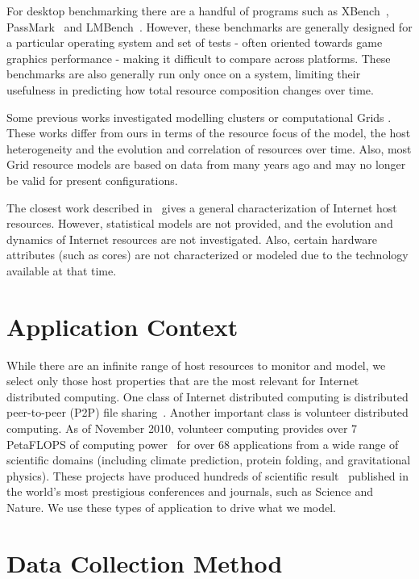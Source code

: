 \documentclass[conference]{IEEEtran}
\begin{document}
For desktop benchmarking there are a handful of programs such as XBench~\cite{xbench},
PassMark~\cite{passmark} and LMBench~\cite{lmbench}.  However, these benchmarks are generally
designed for a particular operating system and set of tests - often oriented towards game graphics performance - 
making it difficult to compare across platforms.  These
benchmarks are also generally run only once on a system,
limiting their usefulness in predicting how total resource
composition changes over time.

Some previous works investigated modelling clusters or
computational Grids
\cite{Kee:2004p763,Sulistio:2008p7929,dinda_gridg}.  These
works differ from ours in terms of the resource focus of the
model, the host heterogeneity and the evolution and
correlation of resources over time.  Also, most Grid
resource models are based on data from many years ago and
may no longer be valid for present configurations.

The closest work described in~\cite{Anderson:2006p180} gives
a general characterization of Internet host resources.  However,
statistical models are not provided, and the evolution and
dynamics of Internet resources are not investigated.  Also,
certain hardware attributes (such as cores) are
not characterized or modeled due to the technology available
at that time.


\section{Application Context}
\label{app-context}

While there are an infinite range of host resources to
monitor and model, we select only those host properties that
are the most relevant for Internet distributed computing.
One class of Internet distributed computing is distributed
peer-to-peer (P2P) file
sharing~\cite{saroiu_mmcn,chu_ITCom,iptps_bhagwan}.  Another
important class is volunteer distributed computing.  As of
November 2010, volunteer computing provides over 7 PetaFLOPS
of computing power~\cite{Anderson:2002p327,Larson:2004p132}
for over 68 applications from a wide range of scientific
domains (including climate prediction, protein folding, and
gravitational physics). These projects have produced
hundreds of scientific result~\cite{boincpapers} published in the
world's most prestigious conferences and journals, such as
Science and Nature.  We use these types of application to
drive what we model.

\section{Data Collection Method}
\label{sec-data-collection}
\end{document}
